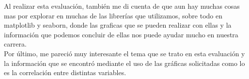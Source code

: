 \documentclass[12pt]{article}
\begin{document}
Al realizar esta evaluación, también me di cuenta de que aun hay muchas cosas mas por explorar en muchas de las librerías que utilizamos, sobre todo en matplotlib y seaborn, donde las graficas que se pueden realizar con ellas y la información que podemos concluir de ellas nos puede ayudar mucho en nuestra carrera. \\

Por último, me pareció muy interesante el tema que se trato en esta evaluación y la información que se encontró mediante el uso de las gráficas solicitadas como lo es la correlación entre distintas variables. 
\end{document}
